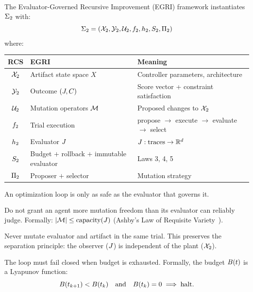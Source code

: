 \documentclass[11pt,a4paper]{article}
\begin{document}
\begin{definition}
\label{def:egri}
The Evaluator-Governed Recursive Improvement (EGRI) framework instantiates
$\Sigma_2$ with:
\begin{equation}
  \Sigma_2 = (\mathcal{X}_2, \mathcal{Y}_2, \mathcal{U}_2, f_2, h_2, S_2, \Pi_2)
\end{equation}
where:
\begin{center}
\begin{tabular}{@{}cll@{}}
  \toprule
  \textbf{RCS} & \textbf{EGRI} & \textbf{Meaning} \\
  \midrule
  $\mathcal{X}_2$ & Artifact state space $X$ & Controller parameters, architecture \\
  $\mathcal{Y}_2$ & Outcome $(J, C)$ & Score vector + constraint satisfaction \\
  $\mathcal{U}_2$ & Mutation operators $\mathcal{M}$ & Proposed changes to $\mathcal{X}_2$ \\
  $f_2$ & Trial execution & propose $\to$ execute $\to$ evaluate $\to$ select \\
  $h_2$ & Evaluator $J$ & $J : \text{traces} \to \mathbb{R}^d$ \\
  $S_2$ & Budget $+$ rollback $+$ immutable evaluator & Laws 3, 4, 5 \\
  $\Pi_2$ & Proposer $+$ selector & Mutation strategy \\
  \bottomrule
\end{tabular}
\end{center}
\end{definition}

\begin{law}
An optimization loop is only as safe as the evaluator that governs it.
\end{law}

\begin{law}
Do not grant an agent more mutation freedom than its evaluator can reliably
judge.  Formally: $\left| \mathcal{M} \right| \leq \text{capacity}(J)$ (Ashby's Law of
Requisite Variety~\cite{ashby1956introduction}).
\end{law}

\begin{law}
Never mutate evaluator and artifact in the same trial.  This preserves the
separation principle: the observer ($J$) is independent of the plant
($\mathcal{X}_2$).
\end{law}

\begin{law}
The loop must fail closed when budget is exhausted.  Formally, the budget
$B(t)$ is a Lyapunov function:
\begin{equation}
  B(t_{k+1}) < B(t_k)
  \quad \text{and} \quad
  B(t_k) = 0 \implies \text{halt}.
\end{equation}
\end{law}
\end{document}

